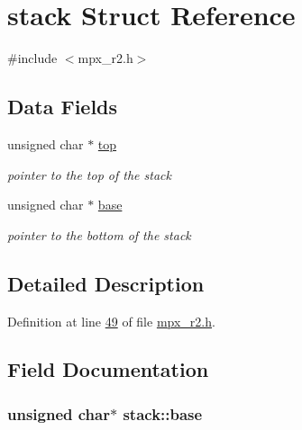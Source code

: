 \hypertarget{structstack}{
\section{stack Struct Reference}
\label{structstack}
}


{\ttfamily \#include $<$mpx\_\-r2.h$>$}

\subsection*{Data Fields}
\begin{DoxyCompactItemize}
\item 
unsigned char $\ast$ \hyperlink{structstack_adf145fa22a24464ff19409e2618a583d}{top}
\begin{DoxyCompactList}\small\item\em pointer to the top of the stack \item\end{DoxyCompactList}\item 
unsigned char $\ast$ \hyperlink{structstack_a1cdb71e486a79747d482aa46f6b10290}{base}
\begin{DoxyCompactList}\small\item\em pointer to the bottom of the stack \item\end{DoxyCompactList}\end{DoxyCompactItemize}


\subsection{Detailed Description}


Definition at line \hyperlink{mpx__r2_8h_source_l00049}{49} of file \hyperlink{mpx__r2_8h_source}{mpx\_\-r2.h}.



\subsection{Field Documentation}
\hypertarget{structstack_a1cdb71e486a79747d482aa46f6b10290}{
\subsubsection[{base}]{\setlength{\rightskip}{0pt plus 5cm}unsigned char$\ast$ {\bf stack::base}}}
\label{structstack_a1cdb71e486a79747d482aa46f6b10290}


